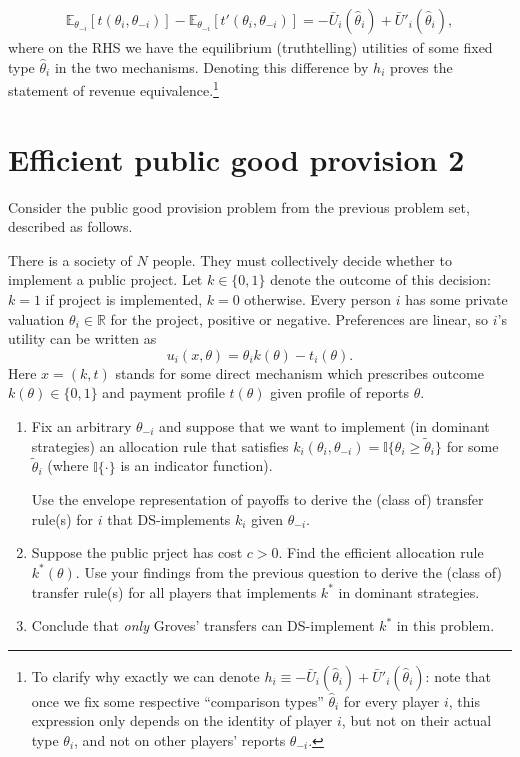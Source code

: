 \documentclass[a4paper]{article}
\begin{document}
	\begin{align*}
		\mathbb{E}_{\theta_{-i}}\left[ t(\theta_i,\theta_{-i}) \right] - \mathbb{E}_{\theta_{-i}}\left[ t'(\theta_i,\theta_{-i}) \right]
		=
		-\bar{U}_i(\hat{\theta}_i) + \bar{U}'_i(\hat{\theta}_i),
	\end{align*}
	where on the RHS we have the equilibrium (truthtelling) utilities of some fixed type $\hat{\theta}_i$ in the two mechanisms. Denoting this difference by $h_i$ proves the statement of revenue equivalence.\footnote{To clarify why exactly we can denote $h_i \equiv -\bar{U}_i(\hat{\theta}_i) + \bar{U}'_i(\hat{\theta}_i)$: note that once we fix some respective ``comparison types'' $\hat{\theta}_i$ for every player $i$, this expression only depends on the identity of player $i$, but not on their actual type $\theta_i$, and not on other players' reports $\theta_{-i}$.}
\fi


\section{Efficient public good provision 2}

	Consider the public good provision problem from the previous problem set, described as follows.
	
	There is a society of $N$ people. They must collectively decide whether to implement a public project. Let $k \in \{0,1\}$ denote the outcome of this decision: $k=1$ if project is implemented, $k=0$ otherwise. Every person $i$ has some private valuation $\theta_i \in \mathbb{R}$ for the project, positive or negative. Preferences are linear, so $i$'s utility can be written as
	$$
		u_i(x,\theta) = \theta_i k(\theta) - t_i(\theta).
	$$
	Here $x=(k,t)$ stands for some direct mechanism which prescribes outcome $k(\theta) \in \{0,1\}$ and payment profile $t(\theta)$ given profile of reports $\theta$.
	
	\begin{enumerate}
		\item Fix an arbitrary $\theta_{-i}$ and suppose that we want to implement (in dominant strategies) an allocation rule that satisfies $k_i(\theta_i, \theta_{-i}) = \mathbb{I}\{\theta_i \geq \tilde{\theta}_i \}$ for some $\tilde{\theta}_i$ (where $\mathbb{I}\{\cdot\}$ is an indicator function).
		
		Use the envelope representation of payoffs to derive the (class of) transfer rule(s) for $i$ that DS-implements $k_i$ given $\theta_{-i}$.
		
		\item Suppose the public prject has cost $c > 0$. Find the efficient allocation rule $k^*(\theta)$. Use your findings from the previous question to derive the (class of) transfer rule(s) for all players that implements $k^*$ in dominant strategies.
		
		\item Conclude that \emph{only} Groves' transfers can DS-implement $k^*$ in this problem.
	\end{enumerate}
\end{document}
